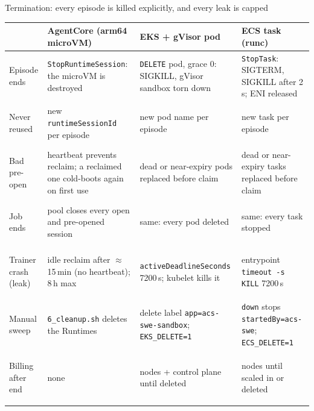\begin{frame}{Termination: every episode is killed explicitly, and every leak is capped}
\scriptsize
\begin{tabularx}{\textwidth}{@{}>{\bfseries\raggedright\arraybackslash}p{2.3cm}*{3}{>{\raggedright\arraybackslash}X}@{}}
\toprule
 & \textbf{AgentCore (arm64 microVM)} & \textbf{EKS + gVisor pod} & \textbf{ECS task (runc)}\\
\midrule
Episode ends & \texttt{StopRuntimeSession}: the microVM is destroyed & \texttt{DELETE} pod, grace 0: SIGKILL, gVisor sandbox torn down & \texttt{StopTask}: SIGTERM, SIGKILL after 2\,s; ENI released\\
Never reused & new \texttt{runtimeSessionId} per episode & new pod name per episode & new task per episode\\
Bad pre-open & heartbeat prevents reclaim; a reclaimed one cold-boots again on first use & dead or near-expiry pods replaced before claim & dead or near-expiry tasks replaced before claim\\
Job ends & pool closes every open and pre-opened session & same: every pod deleted & same: every task stopped\\
Trainer crash (leak) & idle reclaim after $\approx$\,15\,min (no heartbeat); 8\,h max & \texttt{activeDeadlineSeconds} 7200\,s; kubelet kills it & entrypoint \texttt{timeout -s KILL} 7200\,s\\
Manual sweep & \texttt{6\_cleanup.sh} deletes the Runtimes & delete label \texttt{app=acs-swe-sandbox}; \texttt{EKS\_DELETE=1} & \texttt{down} stops \texttt{startedBy=acs-swe}; \texttt{ECS\_DELETE=1}\\
Billing after end & none & nodes + control plane until deleted & nodes until scaled in or deleted\\
\bottomrule
\end{tabularx}
\end{frame}

